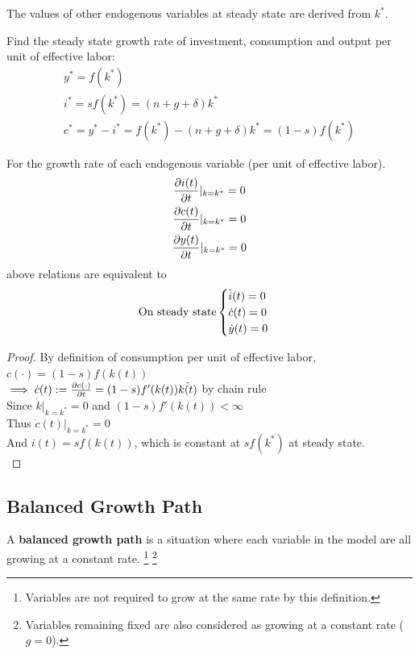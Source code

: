 \documentclass[11pt]{article}
\begin{document}
			\begin{remark}
				The values of other endogenous variables at steady state are derived from $k^*$.
				\begin{example} Find the steady state growth rate of investment, consumption and output per unit of effective labor:
					\begin{gather}
						y^* = f(k^*) \\
						i^* = sf(k^*) = (n+g+\delta) k^* \\
						c^* = y^* - i^* = f(k^*) - (n+g+\delta)k^* = (1-s)f(k^*)
					\end{gather}
				\end{example}
				For the growth rate of each endogenous variable (per unit of effective labor). 
					\begin{gather}
						\frac{\partial{i(t)}}{\partial{t}}|_{k=k^*} = 0 \\
						\frac{\partial{c(t)}}{\partial{t}}|_{k=k^*} = 0 \\
						\frac{\partial{y(t)}}{\partial{t}}|_{k=k^*} = 0 
					\end{gather}
					above relations are equivalent to 
					\begin{gather}
						\text{{On steady state}} \begin{cases}
							\dot{i}(t) = 0 \\
							\dot{c}(t) = 0 \\
							\dot{y}(t) = 0 \\
						\end{cases}
					\end{gather}
			\end{remark}
			
			\begin{proof}
				By definition of consumption per unit of effective labor,\\
				$c(\cdot) = (1-s)f(k(t))$ \\
				$\implies \dot{c}(t) := \frac{\partial{c(\cdot)}}{\partial{t}} = (1-s)f'(k(t)) \dot{k(t)}$ by chain rule \\
				Since $\dot{k}|_{k=k^*} = 0$ and $(1-s)f'(k(t)) < \infty$ \\
				Thus $\dot{c}(t)|_{k=k^*} = 0$ \\
				And $i(t) = sf(k(t))$, which is constant at $sf(k^*)$ at steady state. \\
			\end{proof}
			
		\subsection{Balanced Growth Path}
			\begin{definition}
				A \textbf{balanced growth path} is a situation where each variable in the model are all growing at a constant rate. \footnote{Variables are not required to grow at the same rate by this definition.} \footnote{Variables remaining fixed are also considered as growing at a constant rate ($g=0$).}
			\end{definition}
			
\end{document}
